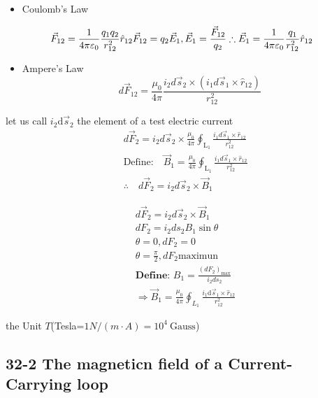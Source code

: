 \documentclass[
]{article}
\providecommand{\tightlist}{%
  \setlength{\itemsep}{0pt}\setlength{\parskip}{0pt}}
\begin{document}
\begin{itemize}
\tightlist
\item
  Coulomb's Law
\end{itemize}

\[
\vec{F}_{12}=\frac1{4\pi\varepsilon_0}\frac{q_1q_2}{r_{12}^2}\hat{r}_{12}\\\vec{F}_{12}=q_2\vec{E}_1, \vec{E}_1=\frac{\vec{F}_{12}}{q_2}\\\therefore\vec{E}_1=\frac1{4\pi\varepsilon_0}\frac{q_1}{r_{12}^2}\hat{r}_{12}
\]

\begin{itemize}
\tightlist
\item
  Ampere's Law \[
  d\vec{F}_{12}=\frac{\mu_0}{4\pi}\frac{i_2d\vec{s}_2\times(i_1d\vec{s}_1\times\hat{r}_{12})}{r_{12}^2}
  \]
\end{itemize}

let us call \(i_2\mathrm d \vec s_2\) the element of a test electric
current \[
\begin{aligned}&d\vec{F}_2=i_2d\vec{s}_2\times\frac{\mu_0}{4\pi}\oint_{\mathrm{L}_1}\frac{i_1d\vec{s}_1\times\hat{r}_{12}}{r_{12}^2}\\&\text{Define:}\quad\vec{B}_1=\frac{\mu_0}{4\pi}\oint_{\mathrm{L}_1}\frac{i_1d\vec{s}_1\times\hat{r}_{12}}{r_{12}^2}\\&\therefore\quad d\vec{F}_2=i_2d\vec{s}_2\times\vec{B}_1\end{aligned}
\]

\[
\begin{aligned}
&d\vec{F}_2=i_2d\vec{s}_2\times\vec{B}_1 \\
&dF_2=i_2ds_2B_1\sin\theta \\
&\theta=0,dF_2=0 \\
&\theta=\frac{\pi}{2}, dF_{2} \mathrm{maximun} \\
&\boxed{\textbf{Define: }B_1=\frac{\left(dF_2\right)_{\max}}{i_2ds_2}}
\\&\Rightarrow \vec B_1=\frac{\mu_0}{4\pi} \oint_{L_1} \frac{i_1\mathrm d \vec s_1 \times \hat r_{12}}{r_{12}^2}
\end{aligned}
\]

the Unit \(T\)(Tesla=\(1N/(m\cdot A)=10^4 \mathrm{~Gauss}\))

\hypertarget{the-magneticn-field-of-a-current-carrying-loop}{%
\subsection{32-2 The magneticn field of a Current-Carrying
loop}\label{the-magneticn-field-of-a-current-carrying-loop}}
\end{document}

